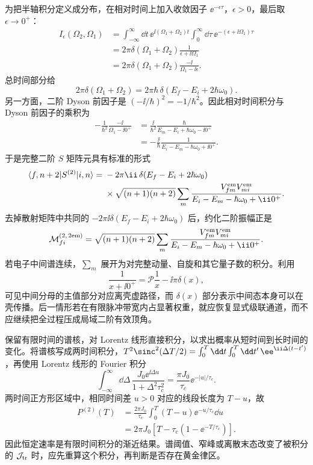 \begin{derivation}[两次量子发射的时间排序与中间态]
为把半轴积分定义成分布，在相对时间上加入收敛因子 $\ee^{-\epsilon\tau}$，$\epsilon>0$，最后取 $\epsilon\to0^+$：
\begin{align*}
 I_\epsilon(\Omega_2,\Omega_1)
 &=\int_{-\infty}^{\infty}\dd t\,
   \ee^{\ii(\Omega_1+\Omega_2)t}
   \int_0^\infty\dd\tau\,
   \ee^{-(\epsilon+\ii\Omega_1)\tau}\\
 &=2\pi\delta(\Omega_1+\Omega_2)
   \frac1{\epsilon+\ii\Omega_1}\\
 &=2\pi\delta(\Omega_1+\Omega_2)
   \frac{-\ii}{\Omega_1-\ii\epsilon}.
\end{align*}
总时间部分给
\begin{equation*}
2\pi\delta(\Omega_1+\Omega_2)
=2\pi\hbar\,
\delta(E_f-E_i+2\hbar\omega_0).
\end{equation*}
另一方面，二阶 Dyson 前因子是 $(-\ii/\hbar)^2=-1/\hbar^2$。因此相对时间积分与 Dyson 前因子的乘积为
\begin{align*}
 -\frac1{\hbar^2}
 \frac{-\ii}{\Omega_1-\ii0^+}
 &=\frac{\ii}{\hbar^2}
 \frac{\hbar}{E_m-E_i+\hbar\omega_0-\ii0^+}\\
 &=-\frac{\ii}{\hbar}
 \frac1{E_i-E_m-\hbar\omega_0+\ii0^+}.
\end{align*}
于是完整二阶 $S$ 矩阵元具有标准的形式
\begin{align*}
 \langle f,n+2|S^{(2)}|i,n\rangle
 ={}&-2\pi\ii\,
 \delta(E_f-E_i+2\hbar\omega_0)\\
 &\times\sqrt{(n+1)(n+2)}
 \sum_m
 \frac{V^{\rm em}_{fm}V^{\rm em}_{mi}}
 {E_i-E_m-\hbar\omega_0+\ii0^+}.
\end{align*}
去掉散射矩阵中共同的 $-2\pi\ii\delta(E_f-E_i+2\hbar\omega_0)$ 后，约化二阶振幅正是
\[
\mathcal M_{fi}^{(2,\,2{\rm em})}
=\sqrt{(n+1)(n+2)}
\sum_m
\frac{V^{\rm em}_{fm}V^{\rm em}_{mi}}
{E_i-E_m-\hbar\omega_0+\ii0^+}.
\]
若电子中间谱连续，$\sum_m$ 展开为对完整动量、自旋和其它量子数的积分。利用
\[
\frac1{x+\ii0^+}
=\mathcal P\frac1x-\ii\pi\delta(x),
\]
可见中间分母的主值部分对应离壳虚路径，而 $\delta(x)$ 部分表示中间态本身可以在壳传播。后一情形若在有限脉冲带宽内占显著权重，就应恢复显式级联通道，而不应继续把全过程压成局域二阶有效顶角。
\end{derivation}

\begin{derivation}
保留有限时间的谱核，对 Lorentz 线形直接积分，以求出概率从短时间到长时间的变化。将谱核写成两时间积分，$T^2\sinc^2(\Delta T/2)=\int_0^T\dd t\int_0^T\dd t'\,\ee^{\ii\Delta(t-t')}$，再使用 Lorentz 线形的 Fourier 积分
\begin{equation*}
 \int_{-\infty}^{\infty}\dd\Delta\,
 \frac{J_0\ee^{\ii\Delta u}}{1+\Delta^2\tau_c^2}
 =\frac{\pi J_0}{\tau_c}\ee^{-|u|/\tau_c}.
\end{equation*}
两时间正方形区域中，相同时间差 $u>0$ 对应的线段长度为 $T-u$，故
\begin{align*}
 P^{(2)}(T)&=\frac{2\pi J_0}{\tau_c}
 \int_0^T(T-u)\ee^{-u/\tau_c}\dd u\\
 &=2\pi J_0[T-\tau_c(1-\ee^{-T/\tau_c})].
\end{align*}
因此恒定速率是有限时间积分的渐近结果。谱阈值、窄峰或离散末态改变了被积分的 $\mathcal J_{\rm tr}$ 时，应先重算这个积分，再判断是否存在黄金律区。
\end{derivation}
